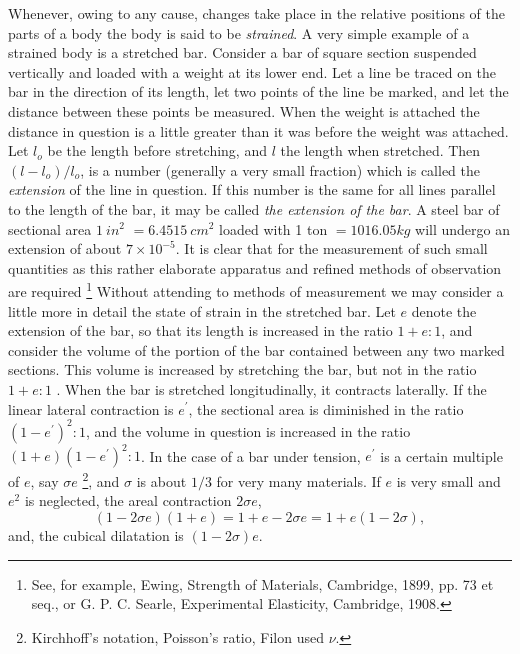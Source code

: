 Whenever, owing to any cause, changes take place in the relative positions 
of the parts of a body the body is said to be \textit{strained}. A very simple 
example of a strained body is a stretched bar. Consider a bar of square 
section suspended vertically and loaded with a weight at its lower end. 
Let a line be traced on the bar in the direction of its length, let two points of 
the line be marked, and let the distance between these points be measured. 
When the weight is attached the distance in question is a little greater than 
it was before the weight was attached. Let \(l_o\) be the length before stretching, and
\(l\) the length when stretched. Then \((l-l_o)/l_o\), is a number (generally a 
very small fraction) which is called the \textit{extension} of the line in question. If 
this number is the same for all lines parallel to the length of the bar, it may 
be called \textit{the extension of the bar}. A steel bar of sectional area \(1~in^2\)
\(=6.4515~cm^2\) loaded with 1 ton \(= 1016.05 kg\) will undergo an extension of about
\(7 \times 10^{-5}\). It is clear that for the measurement of such 
small quantities as this rather elaborate apparatus and refined methods of 
observation are required \footnote{See, for example, Ewing, Strength of
Materials, Cambridge, 1899, pp. 73 et seq., or G. P. C. Searle, Experimental
Elasticity, Cambridge, 1908.} Without attending to methods of measurement 
we may consider a little more in detail the state of strain in the stretched 
bar. Let \(e\) denote the extension of the bar, so that its length is increased in 
the ratio \(1+e:1\), and consider the volume of the portion of the bar
contained between any two marked sections. This volume is increased by
stretching the bar, but not in the ratio \(1+e:1\) . When the bar is stretched
longitudinally, it contracts laterally. If the linear lateral contraction is
\(e^{\prime}\), the sectional area is diminished in the ratio
\((1-e^{\prime})^2:1\), and the volume in question is increased in the ratio
\((1+e)(1-e^{\prime})^2:1\).  In the case of a bar under tension,
\(e^{\prime}\) is a certain multiple of \(e\), say \(\sigma e\)
\footnote{Kirchhoff's notation, Poisson's ratio, Filon used \(\nu\).},
and \(\sigma\) is about \(1/3\) for very many materials. If \(e\)
is very small and \(e^2\) is neglected, the areal contraction \(2 \sigma e\), 
\[
(1-2 \sigma e)(1+e) = 1 + e - 2 \sigma e  = 1+ e(1-2 \sigma),
\]
and, the cubical dilatation is \((1-2 \sigma) e\).

